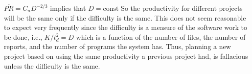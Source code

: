 \documentclass[letterpaper,10pt,english]{jupyterBook}
\begin{document}
\sphinxAtStartPar
\(\overline{PR} = C_n D^{-2/3}\) implies that \(D = \text{const}\)
So the productivity for different projects will be the same only if the difficulty is the same.
This does not seem reasonable to expect very frequently since the difficulty is a measure of the software work to be done, i.e., \(K/t_d^2 = D\)  which is a function of the number of files, the number of reports, and the number of programs the system has.
Thus, planning a new project based on using the same productivity a previous project had, is fallacious unless the difficulty is the same.







\renewcommand{\indexname}{Index}
\printindex
\end{document}
